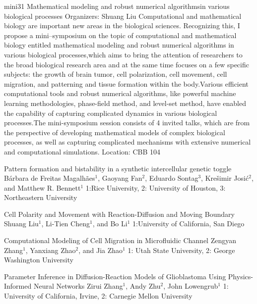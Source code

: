 \mini
{mini31}
{Mathematical modeling and robust numerical algorithmsin various biological processes}
{Organizers: Shuang Liu}
{Computational and mathematical biology are important new areas in the biological sciences. Recognizing this, I propose a mini–symposium on the topic of computational and mathematical biology entitled mathematical modeling and robust numerical algorithms in various biological processes,which aims to bring the attention of researchers to the broad biological research area and at the same time focuses on a few specific subjects: the growth of brain tumor, cell polarization, cell movement, cell migration, and patterning and tissue formation within the body.Various efficient computational tools and robust numerical algorithms, like powerful machine learning methodologies, phase-field method, and level-set method, have enabled the capability of capturing complicated dynamics in various biological processes.The mini-symposium session consists of 4 invited talks, which are from the perspective of developing mathematical models of complex biological processes, as well as capturing complicated mechanisms with extensive numerical and computational simulations.}
{Location: CBB 104}

\begin{talks}
\item\talk
{Pattern formation and bistability in a synthetic intercellular genetic toggle}
{B\'arbara de Freitas Magalh\~aes$^{1}$, Gaoyang Fan$^{2}$, Eduardo Sontag$^{3}$, Kre\v simir Josi\'c$^{2}$, and Matthew R. Bennett$^{1}$}
{1:Rice University, 2: University of Houston, 3: Northeastern University}
\item\talk
{Cell Polarity and Movement with Reaction-Diffusion and Moving Boundary}
{Shuang Liu$^{1}$, Li-Tien Cheng$^{1}$, and Bo Li$^{1}$}
{1:University of California, San Diego}
\item\talk
{Computational Modeling of Cell Migration in Microfluidic Channel}
{Zengyan Zhang$^{1}$, Yanxiang Zhao$^{2}$, and Jia Zhao$^{1}$}
{1: Utah State University, 2: George Washington University}
\item\talk
{Parameter Inference in Diffusion-Reaction Models of Glioblastoma Using Physics-Informed Neural Networks}
{Zirui Zhang$^{1}$, Andy Zhu$^{2}$, John Lowengrub$^{1}$}
{1: University of California, Irvine, 2: Carnegie Mellon University}
\end{talks}
\room
